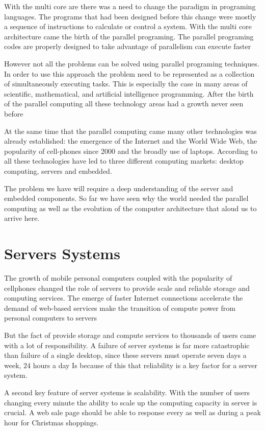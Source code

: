 With the multi core are there was a need to change the paradigm in programing
languages. The programs that had been designed before this change were mostly a
sequence of instructions to calculate or control a system. With the multi core
architecture came the birth of the parallel programing. The parallel programing
codes are properly designed to take advantage of parallelism can execute faster 

However not all the problems can be solved using parallel programing
techniques. In order to use this approach the problem need to be represented as
a collection of simultaneously executing tasks. This is especially the case in
many areas of scientific, mathematical, and artificial intelligence
programming. After the birth of the parallel computing all these technology
areas had a growth never seen before

At the same time that the parallel computing came many other technologies was
already established: the emergence of the Internet and the World Wide Web, the
popularity of cell-phones since 2000 and the broadly use of laptops. According
to \cite{Hennessy} all  these technologies have led to three different computing
markets: desktop computing, servers and embedded. 

The problem we have will require a deep understanding of the server and
embedded components. So far we have seen why the world needed the parallel
computing as well as the evolution of the computer architecture that aloud us
to arrive here.

\section{Servers Systems}
\noindent

The growth of mobile personal computers coupled with the popularity of
cellphones changed the role of servers to provide scale and reliable storage
and computing services. The emerge of faster Internet connections accelerate
the demand of web-based services make the transition of compute power from
personal computers to servers

But the fact of provide storage and compute services to thousands of users came
with a lot of responsibility. A failure of server systems is far more
catastrophic than failure of a single desktop, since these servers must operate
seven days a week, 24 hours a day Is because of this that reliability is a key
factor for a server system.

A second key feature of server systems is scalability. With the number of users
changing every minute the ability to scale up the computing capacity
in server is crucial. A web sale page should be able to response every as well
as during a peak hour for Christmas shoppings.

